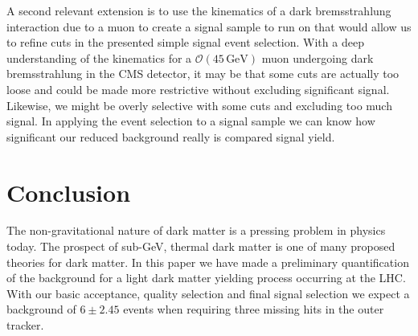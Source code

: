 \documentclass[a4paper,12pt]{article}
\begin{document}
    A second relevant extension is to use the kinematics of a dark
    bremsstrahlung interaction due to a muon to create a signal sample to run on
    that would allow us to refine cuts in the presented simple signal event
    selection.  With a deep understanding of the kinematics for a $\mathcal{O}
    (45\,\text{GeV})$ muon undergoing dark bremsstrahlung in the CMS detector,
    it may be that some cuts are actually too loose and could be made more
    restrictive without excluding significant signal. Likewise, we might be
    overly selective with some cuts and excluding too much signal.  In applying
    the event selection to a signal sample we can know how significant our
    reduced background really is compared signal yield.

\section{Conclusion}

    The non-gravitational nature of dark matter is a pressing problem in physics
    today. The prospect of sub-GeV, thermal dark matter is one of many proposed
    theories for dark matter. In this paper we have made a preliminary
    quantification of the background for a light dark matter yielding process
    occurring at the LHC. With our basic acceptance, quality selection and
    final signal selection we expect a background of $6 \pm 2.45$ events when
    requiring three missing hits in the outer tracker.

{}

\end{document}
